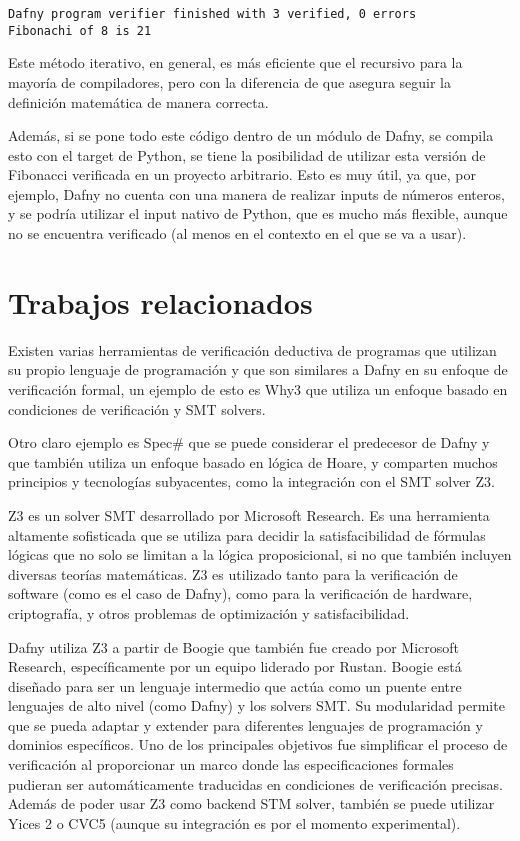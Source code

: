 \documentclass[runningheads]{llncs}
\begin{document}
\begin{verbatim}
Dafny program verifier finished with 3 verified, 0 errors
Fibonachi of 8 is 21
\end{verbatim}

Este método iterativo, en general, es más eficiente que el recursivo para la mayoría de compiladores, pero con la diferencia de que asegura seguir la definición matemática de manera correcta.

Además, si se pone todo este código dentro de un módulo de Dafny, se compila esto con el target de Python, se tiene la posibilidad de utilizar esta versión de Fibonacci verificada en un proyecto arbitrario.
Esto es muy útil, ya que, por ejemplo, Dafny no cuenta con una manera de realizar inputs de números enteros, y se podría utilizar el input nativo de Python, que es mucho más flexible, aunque no se encuentra verificado (al menos en el contexto en el que se va a usar).

\section{Trabajos relacionados} 
Existen varias herramientas de verificación deductiva de programas que utilizan su propio lenguaje de programación 
y que son similares a Dafny en su enfoque de verificación formal, 
un ejemplo de esto es Why3 que utiliza un enfoque basado en condiciones de verificación y SMT solvers.

Otro claro ejemplo es Spec\# que se puede considerar el predecesor de Dafny y que también utiliza un enfoque basado en lógica de Hoare,
y comparten muchos principios y tecnologías subyacentes, como la integración con el SMT solver Z3.

Z3 es un solver SMT desarrollado por Microsoft Research. 
Es una herramienta altamente sofisticada que se utiliza para decidir la satisfacibilidad de fórmulas lógicas que no solo se limitan a la lógica proposicional, 
si no que también incluyen diversas teorías matemáticas.
Z3 es utilizado tanto para la verificación de software (como es el caso de Dafny),
como para la verificación de hardware, criptografía, y otros problemas de optimización y satisfacibilidad.

Dafny utiliza Z3 a partir de Boogie que también fue creado por Microsoft Research, específicamente por un equipo liderado por Rustan. 
Boogie está diseñado para ser un lenguaje intermedio que actúa como un puente entre lenguajes de alto nivel (como Dafny) y los solvers SMT. 
Su modularidad permite que se pueda adaptar y extender para diferentes lenguajes de programación y dominios específicos.
Uno de los principales objetivos fue simplificar el proceso de verificación al proporcionar un marco donde las especificaciones formales pudieran ser automáticamente 
traducidas en condiciones de verificación precisas. Además de poder usar Z3 como backend STM solver, 
también se puede utilizar Yices 2 o CVC5 (aunque su integración es por el momento experimental).
\end{document}
